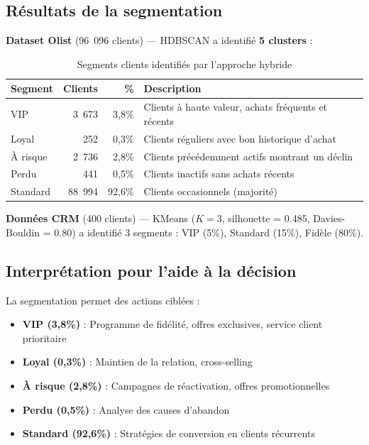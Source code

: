 \documentclass[12pt,a4paper]{report}
\begin{document}
\subsection{R\'{e}sultats de la segmentation}

\textbf{Dataset Olist} (96~096 clients) — HDBSCAN a identifi\'{e} \textbf{5 clusters} :

\begin{table}[H]
\centering
\caption{Segments clients identifi\'{e}s par l'approche hybride}
\label{tab:segments}
\begin{tabularx}{\textwidth}{l r r X}
\toprule
\textbf{Segment} & \textbf{Clients} & \textbf{\%} & \textbf{Description} \\
\midrule
VIP & 3~673 & 3,8\% & Clients \`{a} haute valeur, achats fr\'{e}quents et r\'{e}cents \\
Loyal & 252 & 0,3\% & Clients r\'{e}guliers avec bon historique d'achat \\
\`{A} risque & 2~736 & 2,8\% & Clients pr\'{e}c\'{e}demment actifs montrant un d\'{e}clin \\
Perdu & 441 & 0,5\% & Clients inactifs sans achats r\'{e}cents \\
Standard & 88~994 & 92,6\% & Clients occasionnels (majorit\'{e}) \\
\bottomrule
\end{tabularx}
\end{table}

\textbf{Donn\'{e}es CRM} (400 clients) — KMeans ($K=3$, silhouette = 0.485, Davies-Bouldin = 0.80) a identifi\'{e} 3 segments : VIP (5\%), Standard (15\%), Fid\`{e}le (80\%).

\subsection{Interpr\'{e}tation pour l'aide \`{a} la d\'{e}cision}

La segmentation permet des actions cibl\'{e}es :

\begin{itemize}
  \item \textbf{VIP (3,8\%)} : Programme de fid\'{e}lit\'{e}, offres exclusives, service client prioritaire
  \item \textbf{Loyal (0,3\%)} : Maintien de la relation, cross-selling
  \item \textbf{\`{A} risque (2,8\%)} : Campagnes de r\'{e}activation, offres promotionnelles
  \item \textbf{Perdu (0,5\%)} : Analyse des causes d'abandon
  \item \textbf{Standard (92,6\%)} : Strat\'{e}gies de conversion en clients r\'{e}currents
\end{itemize}
\end{document}
